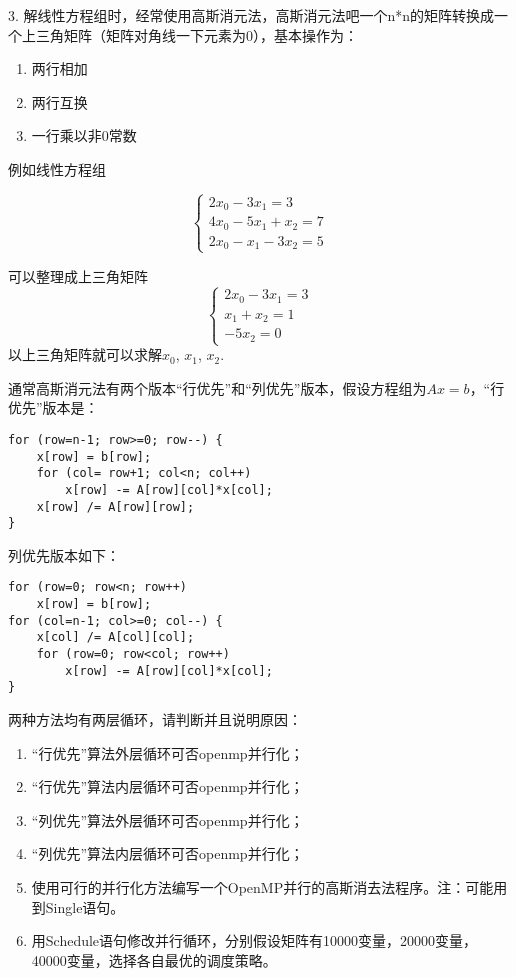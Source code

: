 \documentclass{ctexart}
\begin{document}
3. 解线性方程组时，经常使用高斯消元法，高斯消元法吧一个n*n的矩阵转换成一个上三角矩阵（矩阵对角线一下元素为0），基本操作为：
\begin{enumerate}
\item 两行相加
\item 两行互换
\item 一行乘以非0常数
\end{enumerate}

例如线性方程组

\begin{equation}
  \left\{
   \begin{array}{c}
   2x_0 - 3x_1 = 3  \\
   4x_0 - 5x_1 + x_2 = 7  \\
   2x_0 - x_1-3x_2 = 5  
   \end{array}
  \right.
\end{equation}

可以整理成上三角矩阵
\begin{equation}
  \left\{
   \begin{array}{c}
   2x_0 - 3x_1 = 3  \\
   x_1 + x_2 = 1  \\
   -5x_2 = 0  
   \end{array}
  \right.
\end{equation}
以上三角矩阵就可以求解$x_0$, $x_1$, $x_2$.

通常高斯消元法有两个版本“行优先”和“列优先”版本，假设方程组为$Ax=b$，“行优先”版本是：
\begin{lstlisting}
for (row=n-1; row>=0; row--) {
	x[row] = b[row];
	for (col= row+1; col<n; col++)
		x[row] -= A[row][col]*x[col];
	x[row] /= A[row][row];
}
\end{lstlisting}
列优先版本如下：
\begin{lstlisting}
for (row=0; row<n; row++)
    x[row] = b[row];
for (col=n-1; col>=0; col--) {
    x[col] /= A[col][col];
    for (row=0; row<col; row++)
        x[row] -= A[row][col]*x[col];
}
\end{lstlisting}

两种方法均有两层循环，请判断并且说明原因：
\begin{enumerate}[label=(\alph*)]
\item “行优先”算法外层循环可否openmp并行化；
\item “行优先”算法内层循环可否openmp并行化；
\item “列优先”算法外层循环可否openmp并行化；
\item “列优先”算法内层循环可否openmp并行化；
\item 使用可行的并行化方法编写一个OpenMP并行的高斯消去法程序。注：可能用到Single语句。
\item 用Schedule语句修改并行循环，分别假设矩阵有10000变量，20000变量，40000变量，选择各自最优的调度策略。
\end{enumerate}
\end{document}
